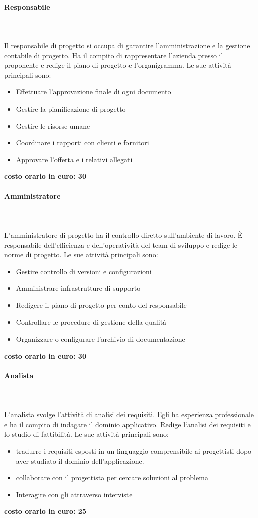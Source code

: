 \documentclass[../norme-di-progetto.tex]{subfiles}
\begin{document}
\paragraph{Responsabile}\mbox{}\\
\label{par:responsabile}
 \\Il responsabile di progetto si occupa di garantire l'amministrazione e la gestione contabile di progetto. Ha il compito di rappresentare l'azienda presso il proponente e redige il piano di progetto e l'organigramma. Le sue attività principali sono:
\begin{itemize}
	\item Effettuare l'approvazione finale di ogni documento
	\item Gestire la pianificazione di progetto
	\item Gestire le risorse umane
	\item Coordinare i rapporti con clienti e fornitori
	\item Approvare l'offerta e i relativi allegati
\end{itemize}
\textbf{costo orario in euro: 30}
\paragraph{Amministratore}\mbox{}\\
\label{par:amministratore}
\\L'amministratore di progetto ha il controllo diretto sull'ambiente di lavoro. È responsabile dell'efficienza e dell'operatività del team di sviluppo e redige le norme di progetto. Le sue attività principali sono:
\begin{itemize}
	\item Gestire controllo di versioni e configurazioni
	\item Amministrare infrastrutture di supporto
	\item Redigere il piano di progetto per conto del responsabile
	\item Controllare le procedure di gestione della qualità
	\item Organizzare o configurare l'archivio di documentazione
\end{itemize}
\textbf{costo orario in euro: 30}
\paragraph{Analista}\mbox{}\\
\label{par:analista}
 \\L'analista svolge l'attività di analisi dei requisiti. Egli ha esperienza professionale e ha il compito di indagare il dominio applicativo. Redige l`analisi dei requisiti e lo studio di fattibilità. Le sue attività principali sono:
\begin{itemize}
	\item tradurre i requisiti esposti in un linguaggio comprensibile ai progettisti dopo aver studiato il dominio dell'applicazione.
	\item collaborare con il progettista per cercare soluzioni al problema
	\item Interagire con gli  attraverso interviste
\end{itemize}
\textbf{costo orario in euro: 25}
\end{document}
